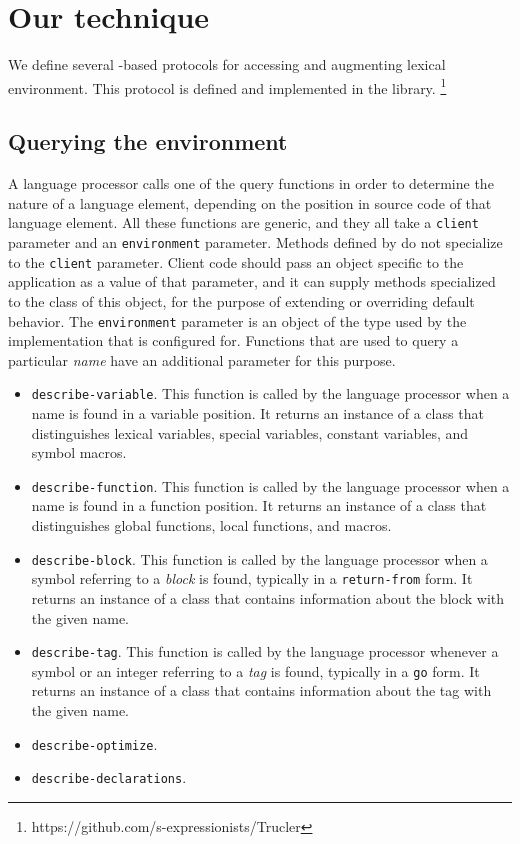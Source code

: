 \section{Our technique}

We define several \clos{}-based protocols for accessing and augmenting
lexical environment.  This protocol is defined and implemented in the
\trucler{} library.%
\footnote{https://github.com/s-expressionists/Trucler}

\subsection{Querying the environment}

A language processor calls one of the query functions in order to
determine the nature of a language element, depending on the position
in source code of that language element.  All these functions are
generic, and they all take a \texttt{client} parameter and an
\texttt{environment} parameter.  Methods defined by \trucler{} do not
specialize to the \texttt{client} parameter.  Client code should pass
an object specific to the application as a value of that parameter,
and it can supply methods specialized to the class of this object, for
the purpose of extending or overriding default behavior.  The
\texttt{environment} parameter is an object of the type used by the
implementation that \trucler{} is configured for.  Functions that are
used to query a particular \emph{name} have an additional parameter
for this purpose.

\begin{itemize}
\item \texttt{describe-variable}.  This function is called by the
  language processor when a name is found in a variable position.  It
  returns an instance of a class that distinguishes lexical variables,
  special variables, constant variables, and symbol macros.
\item \texttt{describe-function}.  This function is called by the
  language processor when a name is found in a function position.  It
  returns an instance of a class that distinguishes global functions,
  local functions, and macros.
\item \texttt{describe-block}.  This function is called by the
  language processor when a symbol referring to a \emph{block} is
  found, typically in a \texttt{return-from} form.  It returns an
  instance of a class that contains information about the block with
  the given name.
\item \texttt{describe-tag}.  This function is called by the language
  processor whenever a symbol or an integer referring to a \emph{tag}
  is found, typically in a \texttt{go} form.  It returns an instance
  of a class that contains information about the tag with the given
  name.
\item \texttt{describe-optimize}.
\item \texttt{describe-declarations}.
\end{itemize}
